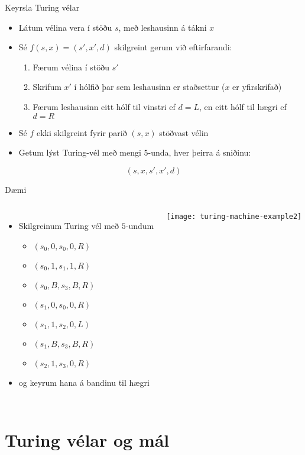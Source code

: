 \documentclass{beamer}
\begin{document}
\begin{frame}{Keyrsla Turing vélar}
\begin{itemize}
 \item Látum vélina vera í stöðu $s$, með leshausinn á tákni $x$
 \item Sé $f(s,x) = (s',x',d)$ skilgreint gerum við eftirfarandi:
 \begin{enumerate}
  \item Færum vélina í stöðu $s'$
  \item Skrifum $x'$ í hólfið þar sem leshausinn er staðsettur ($x$ er yfirskrifað)
  \item Færum leshausinn eitt hólf til vinstri ef $d = L$, en eitt hólf til hægri ef $d = R$
 \end{enumerate}
 \item Sé $f$ ekki skilgreint fyrir parið $(s,x)$ stöðvast vélin
 \item Getum lýst Turing-vél með mengi $5$-unda, hver þeirra á sniðinu:
\end{itemize}
\[(s, x, s' , x' , d)\]
\end{frame}

\begin{frame}{Dæmi}
\begin{columns}
\begin{itemize}
 \item Skilgreinum Turing vél með $5$-undum
 \begin{itemize}
  \item $(s_0 , 0, s_0 , 0, R)$
  \item $(s_0 , 1, s_1 , 1, R)$
  \item $(s_0 , B, s_3 , B, R)$
  \item $(s_1 , 0, s_0 , 0, R)$
  \item $(s_1 , 1, s_2 , 0, L)$
  \item $(s_1 , B, s_3 , B, R)$
  \item $(s_2 , 1, s_3 , 0, R)$
 \end{itemize}
 \item og keyrum hana á bandinu til hægri
\end{itemize}
\begin{center}
\texttt{[image: turing-machine-example2]}
\end{center}
\end{columns}
\end{frame}

\section{Turing vélar og mál}
\end{document}
